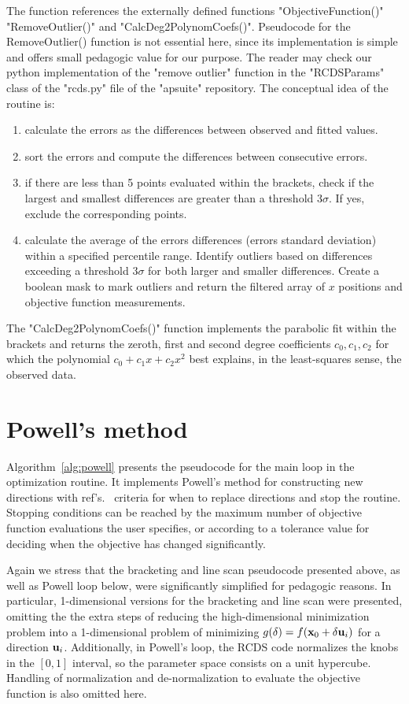 The function references the externally defined functions "ObjectiveFunction()" "RemoveOutlier()" and "CalcDeg2PolynomCoefs()". Pseudocode for the RemoveOutlier() function is not essential here, since its implementation is simple and offers small pedagogic value for our purpose. The reader may check our python implementation of  the "remove outlier" function in the "RCDSParams" class of the "rcds.py" file of the "apsuite" repository. The conceptual idea of the routine is:
\begin{enumerate}
    \item calculate the errors as the differences between observed and fitted values.
    \item sort the errors and compute the differences between consecutive errors.
    \item if there are less than 5 points evaluated within the brackets, check if the largest and smallest differences are greater than a threshold $3\sigma$. If yes, exclude the corresponding points.
    \item calculate the average of the errors differences (errors standard deviation) within a specified percentile range. Identify outliers based on differences exceeding a threshold $3\sigma$ for both larger and smaller differences. Create a boolean mask to mark outliers and return the filtered array of $x$ positions and objective function measurements.
\end{enumerate}

The "CalcDeg2PolynomCoefs()" function implements the parabolic fit within the brackets and returns the zeroth, first and second degree coefficients $c_0, c_1, c_2$ for which the polynomial $c_0 + c_1x + c_2 x^2$ best explains, in the least-squares sense, the observed data.

\section{Powell's method}
Algorithm~\ref{alg:powell} presents the pseudocode for the main loop in the optimization routine. It implements Powell's method for constructing new directions with ref's.~\cite[section 10.7]{press_numerical_2007} criteria for when to replace directions and stop the routine. Stopping conditions can be reached by the maximum number of objective function evaluations the user specifies, or according to a tolerance value for deciding when the objective has changed significantly.

Again we stress that the bracketing and line scan pseudocode presented above, as well as Powell loop below, were significantly simplified for pedagogic reasons. In particular, 1-dimensional versions for the bracketing and line scan were presented, omitting the the extra steps of reducing the high-dimensional minimization problem into a 1-dimensional problem of minimizing $g(\delta) = f(\vb{x}_0 + \delta \vb{u}_i)$ for a direction $\vb{u}_i$. Additionally, in Powell's loop, the RCDS code normalizes the knobs in the $[0, 1]$ interval, so the parameter space consists on a unit hypercube. Handling of normalization and de-normalization to evaluate the objective function is also omitted here.

